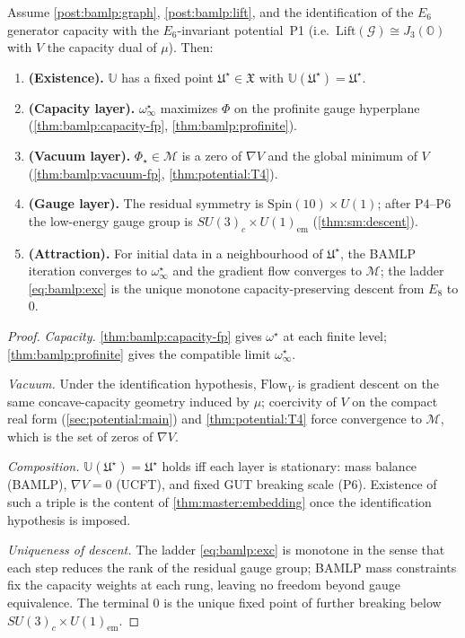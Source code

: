 \begin{theorem}\label{thm:bamlp:universe}
Assume \autoref{post:bamlp:graph}, \autoref{post:bamlp:lift}, and the
identification of the $E_6$ generator capacity with the $E_6$-invariant
potential~\textnormal{P1} (i.e.\ $\mathrm{Lift}(\mathcal{G})\cong J_3(\mathbb{O})$
with $V$ the capacity dual of $\mu$). Then:
\begin{enumerate}[label=\textup{(\alph*)}]
  \item \textbf{(Existence).} $\mathbb{U}$ has a fixed point
    $\mathfrak{U}^\star\in\mathfrak{X}$ with $\mathbb{U}(\mathfrak{U}^\star)=
    \mathfrak{U}^\star$.
  \item \textbf{(Capacity layer).} $\omega^\star_\infty$ maximizes $\Phi$ on the
    profinite gauge hyperplane (\autoref{thm:bamlp:capacity-fp},
    \autoref{thm:bamlp:profinite}).
  \item \textbf{(Vacuum layer).} $\Phi_\star\in\mathcal{M}$ is a zero of
    $\nabla V$ and the global minimum of $V$ (\autoref{thm:bamlp:vacuum-fp},
    \autoref{thm:potential:T4}).
  \item \textbf{(Gauge layer).} The residual symmetry is
    $\mathrm{Spin}(10)\times U(1)$; after P4--P6 the low-energy gauge group is
    $SU(3)_c\times U(1)_{\mathrm{em}}$ (\autoref{thm:sm:descent}).
  \item \textbf{(Attraction).} For initial data in a neighbourhood of
    $\mathfrak{U}^\star$, the BAMLP iteration converges to $\omega^\star_\infty$
    and the gradient flow converges to $\mathcal{M}$; the ladder
    \eqref{eq:bamlp:exc} is the unique monotone capacity-preserving descent
    from $E_8$ to $0$.
\end{enumerate}
\end{theorem}

\begin{proof}
\emph{Capacity.} \autoref{thm:bamlp:capacity-fp} gives $\omega^\star$ at each
finite level; \autoref{thm:bamlp:profinite} gives the compatible limit
$\omega^\star_\infty$.

\emph{Vacuum.} Under the identification hypothesis, $\mathrm{Flow}_V$ is gradient
descent on the same concave-capacity geometry induced by $\mu$; coercivity of
$V$ on the compact real form (\autoref{sec:potential:main}) and
\autoref{thm:potential:T4} force convergence to $\mathcal{M}$, which is the
set of zeros of $\nabla V$.

\emph{Composition.} $\mathbb{U}(\mathfrak{U}^\star)=\mathfrak{U}^\star$ holds
iff each layer is stationary: mass balance (BAMLP), $\nabla V=0$ (UCFT), and
fixed GUT breaking scale (P6). Existence of such a triple is the content of
\autoref{thm:master:embedding} once the identification hypothesis is imposed.

\emph{Uniqueness of descent.} The ladder \eqref{eq:bamlp:exc} is monotone in
the sense that each step reduces the rank of the residual gauge group; BAMLP
mass constraints fix the capacity weights at each rung, leaving no freedom
beyond gauge equivalence. The terminal $0$ is the unique fixed point of
further breaking below $SU(3)_c\times U(1)_{\mathrm{em}}$.
\end{proof}

